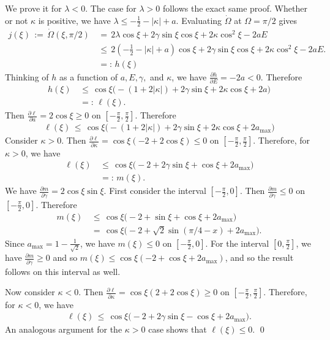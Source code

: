\documentclass[11 pt]{article}
\renewcommand\l{\lambda}
\renewcommand\({\left(}
\renewcommand\){\right)}
\newcommand\<{\langle}
\renewcommand\>{\rangle}
\renewcommand\l{\lambda}
\newcommand\g{\gamma}
\newcommand\8{\infty}
\newcommand{\pd}{\partial}
\begin{document}
\proof
We prove it for $\l < 0$. The case for $\l > 0$ follows the exact same proof. Whether or not $\kappa$ is positive, we have $\l \leq -\frac{1}{2} -|\kappa| + a$. Evaluating $\dot{\Omega}$ at $\Omega = \pi/2$ gives
\begin{align*}
j(\xi) \,:=\, \dot{\Omega}(\xi, \pi/2) \,&=\, 2\l \cos \xi + 2 \gamma \sin \xi \cos\xi + 2\kappa\cos^2 \xi - 2aE
\\
&\leq\, 2\left(-\frac{1}{2} - |\kappa| + a\right) \cos\xi + 2\gamma \sin\xi \cos\xi + 2\kappa\cos^2 \xi - 2aE.
\\
&=:\, h(\xi)
\end{align*}
Thinking of $h$ as a function of $a, E, \gamma,$ and $\kappa$, we have $\frac{\pd h}{\pd E} = -2a < 0$. Therefore 
\begin{align*}
h(\xi) \,&\leq\, \cos\xi\big(-(1+2|\kappa|) + 2\gamma \sin\xi + 2\kappa\cos\xi + 2a\big)
\\
&=:\, \ell(\xi).
\end{align*}
Then $\frac{\pd \ell}{\pd a}= 2\cos \xi \geq 0$ on $[-\frac{\pi}{2}, \frac{\pi}{2}]$. Therefore
\begin{align*}
\ell(\xi) \,\leq\, \cos \xi\big( -(1+2|\kappa|) + 2\gamma \sin\xi + 2\kappa\cos\xi + 2a_{\text{max}}\big)
\end{align*}
Consider $\kappa > 0$. Then $\frac{\pd \ell}{\pd \kappa} = \cos\xi(-2 + 2\cos \xi) \leq 0$ on $[-\frac{\pi}{2}, \frac{\pi}{2}]$. Therefore, for $\kappa > 0$, we have
\begin{align*}
\ell(\xi) \,&\leq\, \cos\xi\big( -2 + 2\gamma \sin \xi +  \cos \xi + 2a_{\text{max}}\big)
\\
&=:\, m(\xi).
\end{align*}
We have $\frac{\pd m}{\pd \g} = 2\cos \xi \sin \xi$. First consider the interval $[-\frac{\pi}{2}, 0]$. Then $\frac{\pd m}{\pd \g} \leq 0$ on $[-\frac{\pi}{2}, 0]$. Therefore 
\begin{align*}
m(\xi) \,&\leq\, \cos\xi\big(-2 + \sin \xi + \cos \xi + 2a_{\text{max}}\big)
\\
&=\, \cos\xi\big(-2 + \sqrt{2}\sin(\pi/4 - x) + 2a_{\text{max}} \big).
\end{align*}
Since $a_{\text{max}} = 1 - \frac{1}{\sqrt{2}}$, we have $m(\xi) \leq 0$ on $[-\frac{\pi}{2}, 0]$. For the interval $[0, \frac{\pi}{2}]$, we have $\frac{\pd m}{\pd \gamma} \geq 0$ and so $m(\xi) \leq \cos\xi(-2 + \cos \xi + 2a_{\text{max}})$, and so the result follows on this interval as well. 

Now consider $\kappa < 0$. Then $\frac{\pd \ell}{\pd\kappa} = \cos\xi(2 + 2\cos \xi) \geq 0$ on $[-\frac{\pi}{2}, \frac{\pi}{2}]$. Therefore, for $\kappa < 0$, we have
\begin{align*}
\ell(\xi) \,\leq \, \cos\xi\big(-2 + 2\gamma \sin \xi - \cos \xi + 2a_{\text{max}}). 
\end{align*}
An analogous argument for the $\kappa > 0$ case shows that $\ell(\xi) \leq 0$. 
\qed
\end{document}

